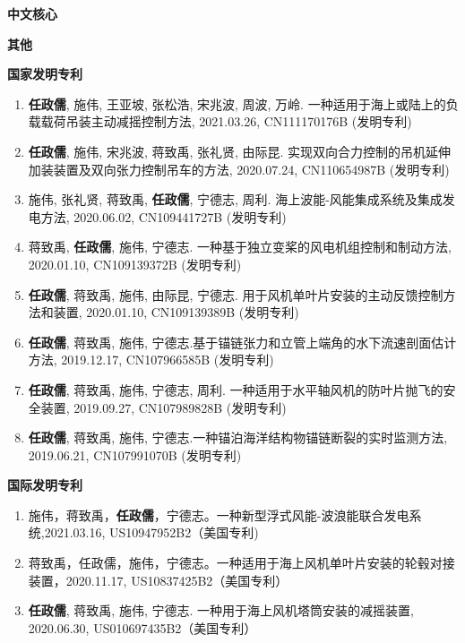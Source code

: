 \documentclass[10pt]{ctexart}
\begin{document}
{    \vspace{-0.8em}
    \textbf{中文核心}\vspace{-1.00em}
    \vspace*{0.1em}
    
    \vspace{-0.8em}
    \textbf{其他}\vspace{-1.00em}
    \vspace*{0.1em}
    
    \vspace{-0.8em}
    \textbf{国家发明专利}\vspace{-1.00em}
    \begin{enumerate}
    \item \textbf{任政儒}, 施伟, 王亚坡, 张松浩, 宋兆波, 周波, 万岭. 一种适用于海上或陆上的负载载荷吊装主动减摇控制方法, 2021.03.26, CN111170176B (发明专利)
    \item \textbf{任政儒}, 施伟, 宋兆波, 蒋致禹, 张礼贤, 由际昆. 实现双向合力控制的吊机延伸加装装置及双向张力控制吊车的方法, 2020.07.24, CN110654987B (发明专利)
    \item 施伟, 张礼贤, 蒋致禹, \textbf{任政儒}, 宁德志, 周利. 海上波能-风能集成系统及集成发电方法, 2020.06.02, CN109441727B (发明专利)
    \item 蒋致禹, \textbf{任政儒}, 施伟, 宁德志. 一种基于独立变桨的风电机组控制和制动方法, 2020.01.10, CN109139372B (发明专利)
    \item \textbf{任政儒}, 蒋致禹, 施伟, 由际昆, 宁德志. 用于风机单叶片安装的主动反馈控制方法和装置, 2020.01.10, CN109139389B (发明专利)
    \item \textbf{任政儒}, 蒋致禹, 施伟, 宁德志.基于锚链张力和立管上端角的水下流速剖面估计方法, 2019.12.17, CN107966585B (发明专利)
    \item \textbf{任政儒}, 蒋致禹, 施伟, 宁德志, 周利. 一种适用于水平轴风机的防叶片抛飞的安全装置, 2019.09.27, CN107989828B (发明专利)
    \item \textbf{任政儒}, 蒋致禹, 施伟, 宁德志.一种锚泊海洋结构物锚链断裂的实时监测方法, 2019.06.21, CN107991070B (发明专利)
     \end{enumerate}
    \vspace*{0.1em}
    
    \vspace{-0.8em}
    \textbf{国际发明专利}\vspace{-1.00em}
    \begin{enumerate}
    \item 施伟，蒋致禹，\textbf{任政儒}，宁德志。一种新型浮式风能-波浪能联合发电系统,2021.03.16, US10947952B2（美国专利)
    \item 蒋致禹，任政儒，施伟，宁德志。一种适用于海上风机单叶片安装的轮毂对接装置，2020.11.17, US10837425B2（美国专利）
     \item \textbf{任政儒}, 蒋致禹, 施伟, 宁德志. 一种用于海上风机塔筒安装的减摇装置, 2020.06.30, US010697435B2（美国专利）
    \end{enumerate}
    \vspace*{0.1em}
    
}
\end{document}
